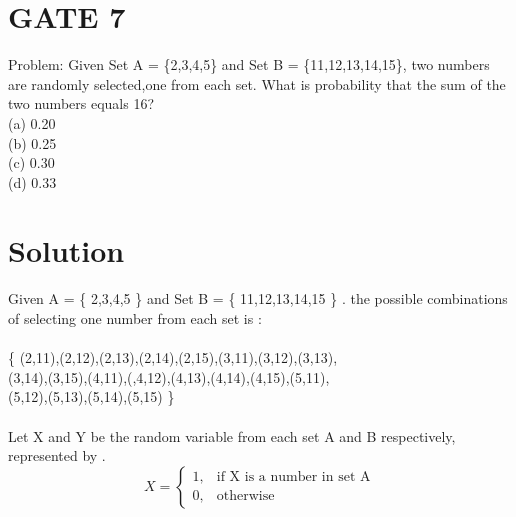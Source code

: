 \documentclass[journal,12pt,twocolumn]{IEEEtran}
\begin{document}
\section{GATE 7}
Problem: Given Set A =  \{2,3,4,5\}  and Set B =
\{11,12,13,14,15\}, two numbers are randomly
selected,one from each set. What is probability
that the sum of the two numbers equals 16? \\
(a) 0.20\\
(b) 0.25\\
(c) 0.30\\
(d) 0.33
\section{Solution}
Given A = \{ 2,3,4,5 \} and Set B = \{ 11,12,13,14,15 \} . the possible combinations of selecting one number from each set is :\\
\\
\{ (2,11),(2,12),(2,13),(2,14),(2,15),(3,11),(3,12),(3,13),\\(3,14),(3,15),(4,11),(,4,12),(4,13),(4,14),(4,15),(5,11),\\(5,12),(5,13),(5,14),(5,15) \} 
\\
\\
Let X and Y be the random variable from each set A and B respectively, represented by . 
\\
\[
    X = 
\begin{cases}
    1,& \text{if X is a number in set A}  \\
    0,              & \text{otherwise}
\end{cases}
\]
\end{document}
